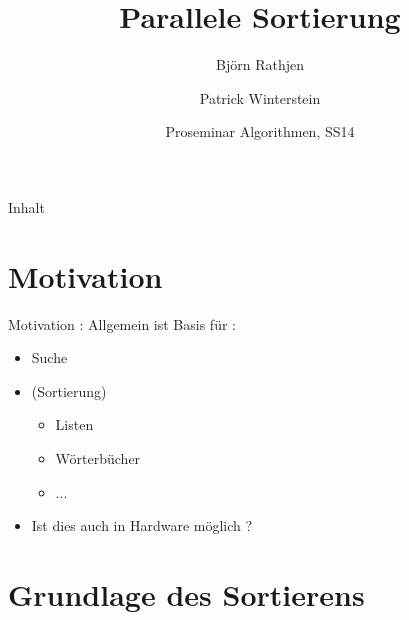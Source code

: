\documentclass[ucs,9pt]{beamer}
\title[Para Sort] %
{Parallele Sortierung}
\author[] %
{Björn Rathjen \and Patrick Winterstein}
\institute[FU Berlin] %
{Freie Universität Berlin}
\date[ProSem Algo]
{Proseminar Algorithmen, SS14}
\begin{document}
\begin{frame}[plain]
  \titlepage
\end{frame}
 
\begin{frame}{Inhalt}
\end{frame}

\section{Motivation}
    
\begin{frame}{Motivation : Allgemein}
    ist Basis für :
    \begin{itemize}
        \item Suche
        \item (Sortierung)
        \begin{itemize}
            \item Listen
            \item Wörterbücher
            \item ... 
        \end{itemize}
        \item Ist dies auch in Hardware möglich ?
    \end{itemize}
\end{frame}

\section{Grundlage des Sortierens}
\end{document}
